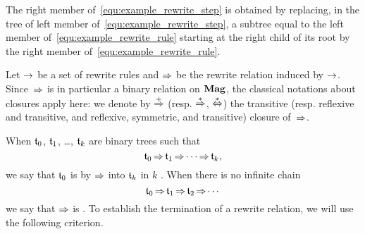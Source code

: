 The right member of~\eqref{equ:example_rewrite_step} is obtained by
replacing, in the tree of left member
of~\eqref{equ:example_rewrite_step}, a subtree equal to the left
member of~\eqref{equ:example_rewrite_rule} starting at the right child
of its root by the right member of~\eqref{equ:example_rewrite_rule}.
\medbreak

Let $\operatorname{\to}$ be a set of rewrite rules and $\operatorname{\Rightarrow}$ be the rewrite
relation induced by $\operatorname{\to}$. Since~$\operatorname{\Rightarrow}$ is in particular a
binary relation on $\mathbf{Mag}$, the classical notations about closures apply
here: we denote by $\operatorname{\overset{+}{\operatorname{\Rightarrow}}}$ (resp. $\operatorname{\overset{\ast}{\operatorname{\Rightarrow}}}$,
$\operatorname{\overset{\ast}{\Leftrightarrow}}$) the transitive (resp. reflexive and transitive,
and reflexive, symmetric, and transitive) closure of~$\operatorname{\Rightarrow}$.
\medbreak

When $\mathfrak{t}_0$, $\mathfrak{t}_1$, \dots, $\mathfrak{t}_k$ are binary trees such that
\begin{equation}
    \mathfrak{t}_0 \operatorname{\Rightarrow} \mathfrak{t}_1 \operatorname{\Rightarrow} \cdots \operatorname{\Rightarrow} \mathfrak{t}_k,
\end{equation}
we say that $\mathfrak{t}_0$ is  by $\operatorname{\Rightarrow}$ into $\mathfrak{t}_k$
in $k$ . When there is no infinite chain
\begin{equation} \label{equ:infinite_chain}
    \mathfrak{t}_0 \operatorname{\Rightarrow} \mathfrak{t}_1 \operatorname{\Rightarrow} \mathfrak{t}_2 \operatorname{\Rightarrow} \cdots
\end{equation}
we say that $\operatorname{\Rightarrow}$ is . To establish the
termination of a rewrite relation, we will use the following criterion.
\medbreak

